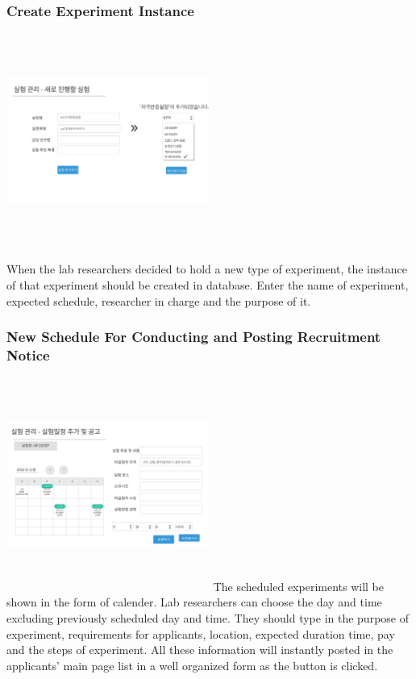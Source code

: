 \documentclass[letterpaper, 10 pt, conference]{ieeeconf}  %
\begin{document}
\subsubsection{Create Experiment Instance}

\includegraphics[width=0.5\textwidth,height = 7cm]{Oven/07_addNewExperiment.jpg}

When the lab researchers decided to hold a new type of experiment, the instance of that experiment should be created in database. Enter the name of experiment, expected schedule, researcher in charge and the purpose of it. \\


\subsubsection{New Schedule For Conducting and Posting Recruitment Notice}
\includegraphics[width=0.5\textwidth,height = 7cm]{Oven_ver2/ver2]10_scheduleNotice.jpg}
The scheduled experiments will be shown in the form of calender. Lab researchers can choose the day and time excluding previously scheduled day and time. They should type in the purpose of experiment, requirements for applicants, location, expected duration time, pay and the steps of experiment. All these information will instantly posted in the applicants' main page list in a well organized form as the button is clicked. 
\end{document}
